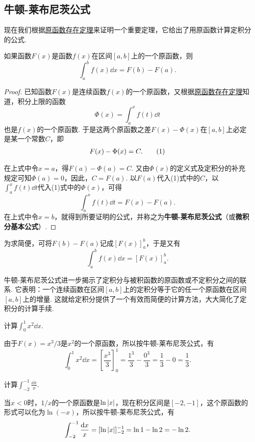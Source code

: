 \subsection{牛顿-莱布尼茨公式}
现在我们根据\hyperref[theorem:定积分.原函数存在定理]{原函数存在定理}来证明一个重要定理，它给出了用原函数计算定积分的公式.
\begin{theorem}[牛顿-莱布尼茨公式]
如果函数\(F(x)\)是函数\(f(x)\)在区间\([a,b]\)上的一个原函数，则\begin{equation}\label{equation:定积分.牛顿-莱布尼茨公式}
\int_a^b f(x) \dd{x} = F(b) - F(a).
\end{equation}
\begin{proof}
已知函数\(F(x)\)是连续函数\(f(x)\)的一个原函数，又根据\hyperref[theorem:定积分.原函数存在定理]{原函数存在定理}知道，积分上限的函数\[
\Phi(x) = \int_a^x f(t) \dd{t}
\]也是\(f(x)\)的一个原函数.
于是这两个原函数之差\(F(x) - \Phi(x)\)在\([a,b]\)上必定是某一个常数\(C\)，即\begin{gather}
F(x) - \Phi(x) = C. \tag1
\end{gather}

在上式中令\(x=a\)，得\(F(a) - \Phi(a) = C\).
又由\(\Phi(x)\)的定义式及定积分的补充规定可知\(\Phi(a) = 0\)，因此，\(C = F(a)\).
以\(F(a)\)代入(1)式中的\(C\)，以\(\int_a^x f(t) \dd{t}\)代入(1)式中的\(\Phi(x)\)，可得\[
\int_a^x f(t) \dd{t} = F(x) - F(a).
\]在上式中令\(x=b\)，就得到所要证明的公式，并称之为\textbf{牛顿-莱布尼茨公式}（或\textbf{微积分基本公式}）.
\end{proof}
\end{theorem}
为求简便，可将\(F(b) - F(a)\)记成\([F(x)]_a^b\)，于是又有\[
\int_a^b f(x) \dd{x} = [F(x)]_a^b.
\]

牛顿-莱布尼茨公式进一步揭示了定积分与被积函数的原函数或不定积分之间的联系.
它表明：一个连续函数在区间\([a,b]\)上的定积分等于它的任一个原函数在区间\([a,b]\)上的增量.
这就给定积分提供了一个有效而简便的计算方法，大大简化了定积分的计算手续.

\begin{example}
计算\(\int_0^1 x^2 \dd{x}\).
\begin{solution}
由于\(F(x) = x^3/3\)是\(x^2\)的一个原函数，所以按牛顿-莱布尼茨公式，有\[
\int_0^1 x^2 \dd{x} = \left[\frac{x^3}{3}\right]_0^1
= \frac{1^3}{3} - \frac{0^3}{3} = \frac{1}{3} - 0 = \frac{1}{3}.
\]
\end{solution}
\end{example}

\begin{example}
计算\(\int_{-2}^{-1} \frac{\dd{x}}{x}\).
\begin{solution}
当\(x<0\)时，\(1/x\)的一个原函数是\(\ln\abs{x}\)，现在积分区间是\([-2,-1]\)，这个原函数的形式可以化为\(\ln(-x)\)，所以按牛顿-莱布尼茨公式，有\[
\int_{-2}^{-1} \frac{\dd{x}}{x}
= [ \ln\abs{x} ]_{-2}^{-1}
= \ln1 - \ln2
= -\ln2.
\]
\end{solution}
\end{example}

